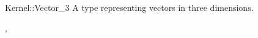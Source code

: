 \begin{ccRefFunctionObjectConcept}{Kernel::Vector_3}
\ccDefinition
A type representing vectors in three dimensions.

\ccRefines
{},

\ccSeeAlso
{}

\end{ccRefFunctionObjectConcept}
